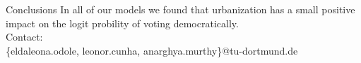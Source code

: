 \documentclass{beamer}
\begin{document}



\begin{frame}{Conclusions}
    In all of our models we found that urbanization has a small positive impact on the logit probility of voting democratically.
    \\
    Contact:\\
    \{eldaleona.odole, leonor.cunha, anarghya.murthy\}@tu-dortmund.de
\end{frame}


\end{document}
